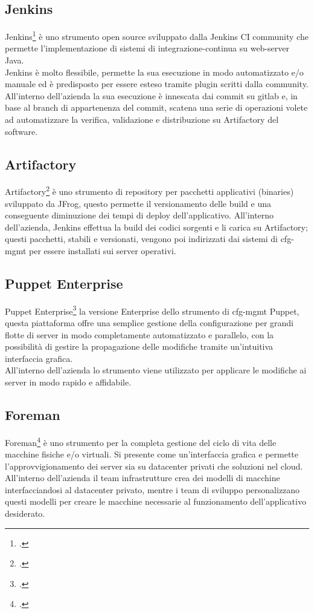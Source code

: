 \subsection{Jenkins}
Jenkins\footcite{site:jenkins} è uno strumento open source sviluppato dalla Jenkins CI community che permette l'implementazione di sistemi di \gls{integrazione-continua} su web-server Java. \\
Jenkins è molto flessibile, permette la sua esecuzione in modo automatizzato e/o manuale ed è predisposto per essere esteso tramite plugin scritti dalla community. \\
All'interno dell'azienda la sua esecuzione è innescata dai commit su gitlab e, in base al \gls{branch} di appartenenza del commit, scatena una serie di operazioni volete ad automatizzare la verifica, validazione e distribuzione su Artifactory del software.
\subsection{Artifactory}
Artifactory\footcite{site:artifactory} è uno strumento di repository per pacchetti applicativi (binaries) sviluppato da JFrog, questo permette il versionamento delle \gls{build} e una conseguente diminuzione dei tempi di \gls{deploy} dell'applicativo.
All'interno dell'azienda, Jenkins effettua la \gls{build} dei codici sorgenti e li carica su Artifactory; questi pacchetti, stabili e versionati, vengono poi indirizzati dai sistemi di \gls{cfg-mgmt} per essere installati sui server operativi.
\subsection{Puppet Enterprise}
Puppet Enterprise\footcite{site:puppet} la versione Enterprise dello strumento di \gls{cfg-mgmt} Puppet, questa piattaforma offre una semplice gestione della configurazione per grandi flotte di server in modo completamente automatizzato e parallelo, con la possibilità di gestire la propagazione delle modifiche tramite un'intuitiva interfaccia grafica.\\
All'interno dell'azienda lo strumento viene utilizzato per applicare le modifiche ai server in modo rapido e affidabile.
\subsection{Foreman}
Foreman\footcite{site:foreman} è uno strumento per la completa gestione del ciclo di vita delle macchine fisiche e/o virtuali. Si presente come un'interfaccia grafica e permette l'approvvigionamento dei server sia su \gls{datacenter} privati che soluzioni nel cloud. \\
All'interno dell'azienda il team infrastrutture crea dei modelli di macchine interfacciandosi al \gls{datacenter} privato, mentre i team di sviluppo personalizzano questi modelli per creare le macchine necessarie al funzionamento dell'applicativo desiderato.
